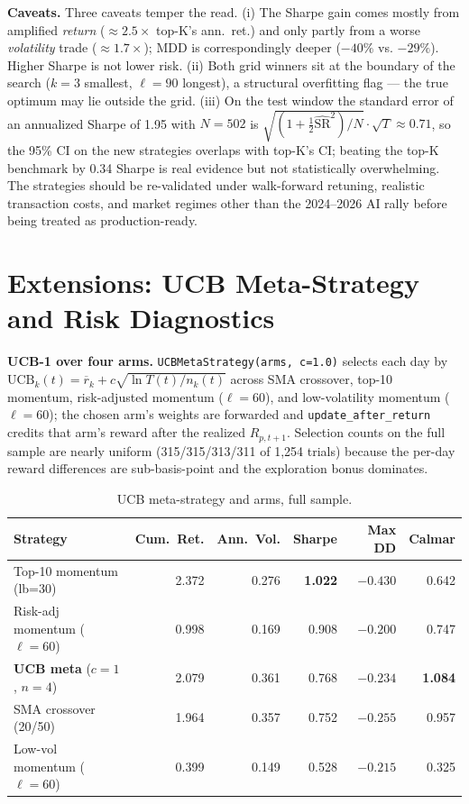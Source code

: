 \documentclass[11pt]{article}
\begin{document}
\textbf{Caveats.} Three caveats temper the read. (i) The Sharpe gain
comes mostly from amplified \emph{return} ($\approx 2.5\times$ top-K's
ann.\ ret.) and only partly from a worse \emph{volatility} trade
($\approx 1.7\times$); MDD is correspondingly deeper ($-40\%$ vs.
$-29\%$). Higher Sharpe is not lower risk. (ii) Both grid winners sit at
the boundary of the search ($k=3$ smallest, $\ell=90$ longest), a
structural overfitting flag --- the true optimum may lie outside the
grid. (iii) On the test window the standard error of an annualized
Sharpe of 1.95 with $N=502$ is
$\sqrt{(1+\tfrac{1}{2}\widehat{\mathrm{SR}}^2)/N}\cdot\sqrt{T}\approx 0.71$,
so the 95\% CI on the new strategies overlaps with top-K's CI; beating
the top-K benchmark by 0.34 Sharpe is real evidence but not statistically
overwhelming. The strategies should be re-validated under walk-forward
retuning, realistic transaction costs, and market regimes other than the
2024--2026 AI rally before being treated as production-ready.

\section{Extensions: UCB Meta-Strategy and Risk Diagnostics}
\label{sec:ext}

\textbf{UCB-1 over four arms.} \texttt{UCBMetaStrategy(arms, c=1.0)}
selects each day by
$\mathrm{UCB}_k(t) = \overline{r}_k + c\sqrt{\ln T(t)/n_k(t)}$
across SMA crossover, top-10 momentum, risk-adjusted momentum
($\ell{=}60$), and low-volatility momentum ($\ell{=}60$); the chosen
arm's weights are forwarded and \texttt{update\_after\_return} credits
that arm's reward after the realized $R_{p,t+1}$. Selection counts on
the full sample are nearly uniform (315/315/313/311 of 1{,}254 trials)
because the per-day reward differences are sub-basis-point and the
exploration bonus dominates.

\begin{table}[h!]
\centering
\caption{UCB meta-strategy and arms, full sample.}
\begin{tabular}{lrrrrr}
\toprule
\textbf{Strategy} & \textbf{Cum.\ Ret.} & \textbf{Ann.\ Vol.} & \textbf{Sharpe} & \textbf{Max DD} & \textbf{Calmar} \\
\midrule
Top-10 momentum (lb=30)                & 2.372 & 0.276 & \textbf{1.022} & $-0.430$           & 0.642          \\
Risk-adj momentum ($\ell{=}60$)        & 0.998 & 0.169 & 0.908          & $\mathbf{-0.200}$  & 0.747          \\
\textbf{UCB meta} ($c{=}1$, $n{=}4$)   & 2.079 & 0.361 & 0.768          & $-0.234$           & \textbf{1.084} \\
SMA crossover (20/50)                  & 1.964 & 0.357 & 0.752          & $-0.255$           & 0.957          \\
Low-vol momentum ($\ell{=}60$)         & 0.399 & 0.149 & 0.528          & $-0.215$           & 0.325          \\
\bottomrule
\end{tabular}
\end{table}
\end{document}
